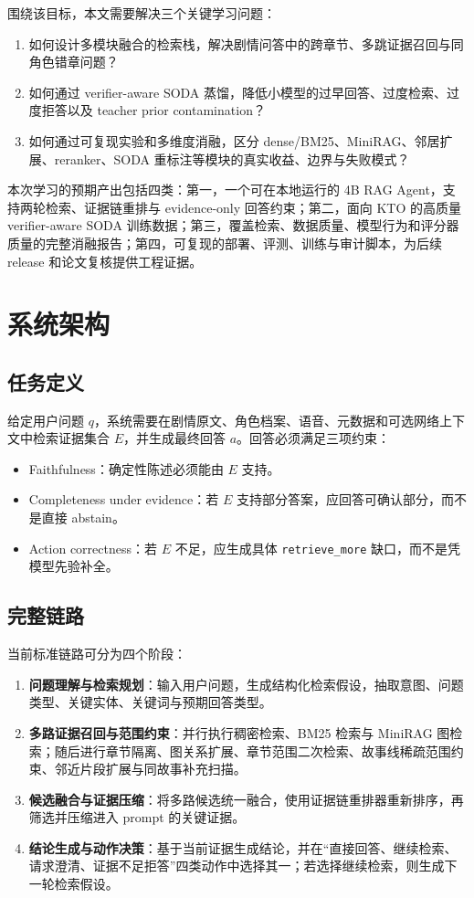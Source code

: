 \documentclass[UTF8,a4paper,12pt]{ctexart}
\newcommand{\code}[1]{\texttt{#1}}
\begin{document}
围绕该目标，本文需要解决三个关键学习问题：
\begin{enumerate}
  \item 如何设计多模块融合的检索栈，解决剧情问答中的跨章节、多跳证据召回与同角色错章问题？
  \item 如何通过 verifier-aware SODA 蒸馏，降低小模型的过早回答、过度检索、过度拒答以及 teacher prior contamination？
  \item 如何通过可复现实验和多维度消融，区分 dense/BM25、MiniRAG、邻居扩展、reranker、SODA 重标注等模块的真实收益、边界与失败模式？
\end{enumerate}

本次学习的预期产出包括四类：第一，一个可在本地运行的 4B RAG Agent，支持两轮检索、证据链重排与 evidence-only 回答约束；第二，面向 KTO 的高质量 verifier-aware SODA 训练数据；第三，覆盖检索、数据质量、模型行为和评分器质量的完整消融报告；第四，可复现的部署、评测、训练与审计脚本，为后续 release 和论文复核提供工程证据。

\section{系统架构}

\subsection{任务定义}

给定用户问题 $q$，系统需要在剧情原文、角色档案、语音、元数据和可选网络上下文中检索证据集合 $E$，并生成最终回答 $a$。回答必须满足三项约束：
\begin{itemize}
  \item Faithfulness：确定性陈述必须能由 $E$ 支持。
  \item Completeness under evidence：若 $E$ 支持部分答案，应回答可确认部分，而不是直接 abstain。
  \item Action correctness：若 $E$ 不足，应生成具体 \code{retrieve\_more} 缺口，而不是凭模型先验补全。
\end{itemize}

\subsection{完整链路}

当前标准链路可分为四个阶段：
\begin{enumerate}
  \item \textbf{问题理解与检索规划}：输入用户问题，生成结构化检索假设，抽取意图、问题类型、关键实体、关键词与预期回答类型。
  \item \textbf{多路证据召回与范围约束}：并行执行稠密检索、BM25 检索与 MiniRAG 图检索；随后进行章节隔离、图关系扩展、章节范围二次检索、故事线稀疏范围约束、邻近片段扩展与同故事补充扫描。
  \item \textbf{候选融合与证据压缩}：将多路候选统一融合，使用证据链重排器重新排序，再筛选并压缩进入 prompt 的关键证据。
  \item \textbf{结论生成与动作决策}：基于当前证据生成结论，并在“直接回答、继续检索、请求澄清、证据不足拒答”四类动作中选择其一；若选择继续检索，则生成下一轮检索假设。
\end{enumerate}
\end{document}
